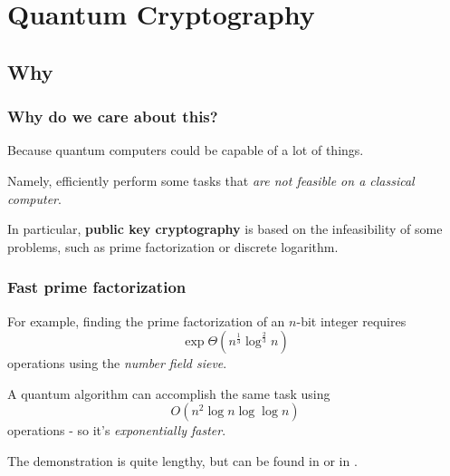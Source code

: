 \documentclass{beamer}
\begin{document}
  \section{Quantum Cryptography}
  \subsection{Why}
  \begin{frame}
    \frametitle{Why do we care about this?}
    Because quantum computers could be capable of a lot of things.
    
    Namely, efficiently perform some tasks that \textit{are not feasible on a classical computer}.

    In particular, \textbf{public key cryptography} is based on the infeasibility of
    some problems, such as prime factorization or discrete logarithm.
  \end{frame}
  \begin{frame}
    \frametitle{Fast prime factorization}
    For example, finding the prime factorization of an $n$-bit integer requires
    \begin{equation*}
      \exp{\Theta\left(n^{\frac13}\log^{\frac23}n\right)}
    \end{equation*}
    operations using the \textit{number field sieve}.

    A quantum algorithm can accomplish the same task using
    \begin{equation*}
      O\left(n^2\log n \log\log n\right)
    \end{equation*}
    operations - so it's \textit{exponentially faster}.

    The demonstration is quite lengthy, but can be found in
    \cite{nielsen-chuang} or in \cite{de-wolf}.
  \end{frame}
\end{document}

